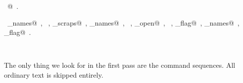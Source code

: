 \documentclass{report}
\begin{document}
\begin{flushleft}
\begin{minipage}{\linewidth}
\begin{list}{}{\setlength{\itemsep}{-\parsep}\setlength{\itemindent}{-\leftmargin}}
\item \NWtxtIdentsDefed\nobreak\  @\nobreak\ .\end{list}
\vspace{-2ex}
\footnotesize\addtolength{\baselineskip}{-1ex}
\begin{list}{}{\setlength{\itemsep}{-\parsep}\setlength{\itemindent}{-\leftmargin}}
\item \NWtxtIdentsUsed\nobreak\  \verb@file_names@\nobreak\ , \verb@fprintf@\nobreak\ , \verb@init_scraps@\nobreak\ , \verb@macro_names@\nobreak\ , \verb@search@\nobreak\ , \verb@source_open@\nobreak\ , \verb@stderr@\nobreak\ , \verb@tex_flag@\nobreak\ , \verb@user_names@\nobreak\ , \verb@verbose_flag@\nobreak\ .\end{list}
\end{minipage}\\[4ex]
\end{flushleft}
The only thing we look for in the first pass are the command
sequences. All ordinary text is skipped entirely.
\end{document}
